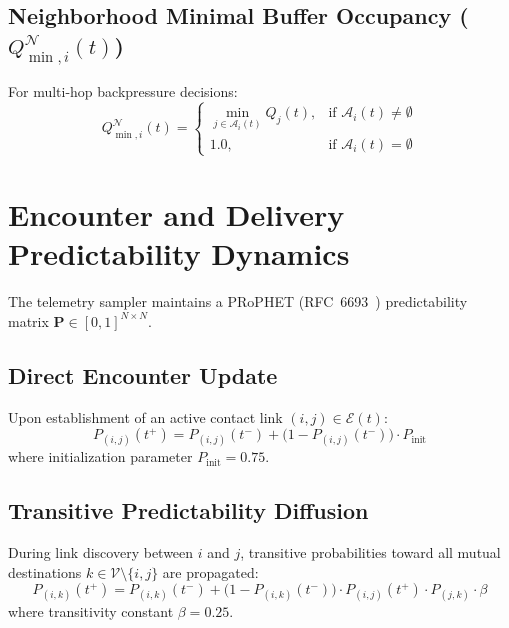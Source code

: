 \documentclass[journal,compsoc]{IEEEtran}
\begin{document}
\subsection{Neighborhood Minimal Buffer Occupancy ($Q_{\min, i}^{\mathcal{N}}(t)$)}
For multi-hop backpressure decisions:
\begin{equation}
Q_{\min, i}^{\mathcal{N}}(t) = \begin{cases}
\min_{j \in \mathcal{A}_i(t)} Q_j(t), & \text{if } \mathcal{A}_i(t) \ne \emptyset \\
1.0, & \text{if } \mathcal{A}_i(t) = \emptyset
\end{cases}
\end{equation}

\section{Encounter and Delivery Predictability Dynamics}

The telemetry sampler maintains a PRoPHET (RFC~6693~\cite{rfc6693}) predictability matrix $\mathbf{P} \in [0, 1]^{N \times N}$.

\subsection{Direct Encounter Update}
Upon establishment of an active contact link $(i, j) \in \mathcal{E}(t)$:
\begin{equation}
P_{(i, j)}(t^+) = P_{(i, j)}(t^-) + \bigl(1 - P_{(i, j)}(t^-)\bigr) \cdot P_{\mathrm{init}}
\label{eq:prophet_direct}
\end{equation}
where initialization parameter $P_{\mathrm{init}} = 0.75$.

\subsection{Transitive Predictability Diffusion}
During link discovery between $i$ and $j$, transitive probabilities toward all mutual destinations $k \in \mathcal{V} \setminus \{i, j\}$ are propagated:
\begin{equation}
P_{(i, k)}(t^+) = P_{(i, k)}(t^-) + \bigl(1 - P_{(i, k)}(t^-)\bigr) \cdot P_{(i, j)}(t^+) \cdot P_{(j, k)} \cdot \beta
\label{eq:prophet_trans}
\end{equation}
where transitivity constant $\beta = 0.25$.
\end{document}
